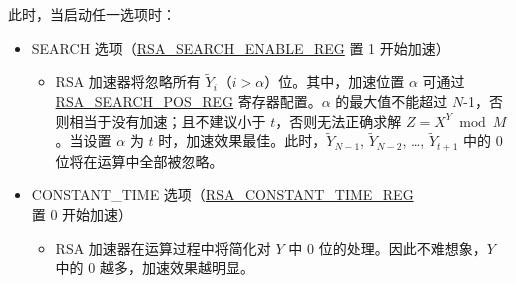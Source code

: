 \documentclass[main\_\_CN.tex]{subfiles}
\begin{document}
此时，当启动任一选项时：
\begin{itemize}
\item SEARCH 选项（\hyperref[regdesc:RSASEARCHENABLEREG]{RSA\_SEARCH\_ENABLE\_REG} 置 1 开始加速）
    \begin{itemize}
        \item RSA 加速器将忽略所有 \begin{math} \widetilde{Y}_{i} \end{math}（\begin{math} i > \alpha \end{math}）位。其中，加速位置 \begin{math} \alpha \end{math} 可通过 \hyperref[regdesc:RSASEARCHPOSREG]{RSA\_SEARCH\_POS\_REG} 寄存器配置。\begin{math} \alpha \end{math} 的最大值不能超过 \begin{math}N\end{math}-1，否则相当于没有加速；且不建议小于 \begin{math} t \end{math}，否则无法正确求解 \begin{math}Z = X^{Y} \bmod M \end{math}。当设置 \begin{math} \alpha \end{math} 为 \begin{math} t \end{math} 时，加速效果最佳。此时，\begin{math}\widetilde{Y}_{N-1}\end{math}, \begin{math}\widetilde{Y}_{N-2}\end{math}, \dots, \begin{math}\widetilde{Y}_{t+1}\end{math} 中的 0 位将在运算中全部被忽略。
    \end{itemize}
\item CONSTANT\_TIME 选项（\hyperref[regdesc:RSACONSTANTTIMEREG]{RSA\_CONSTANT\_TIME\_REG} 置 0 开始加速）
    \begin{itemize}
        \item RSA 加速器在运算过程中将简化对 \begin{math} Y \end{math} 中 0 位的处理。因此不难想象，\begin{math} Y \end{math} 中的 0 越多，加速效果越明显。
    \end{itemize}
\end{itemize}
\end{document}
